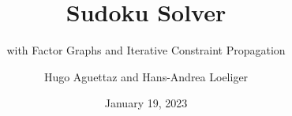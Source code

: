 \documentclass{beamer}
\title{Sudoku Solver}
\subtitle{with Factor Graphs and Iterative Constraint Propagation}
\author{Hugo Aguettaz and Hans-Andrea Loeliger}
\institute{Institut für Signal- und Informationsverarbeitung\\ETH Zürich}
\date{January 19, 2023}
\begin{document}
	\begin{frame}
		\titlepage
	\end{frame} 
\end{document}
